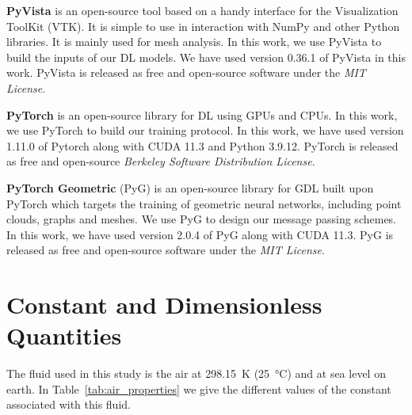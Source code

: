 \begin{subappendices}
	\textbf{PyVista} \cite{pyvista} is an open-source tool based on a handy interface for the Visualization ToolKit (VTK). It is simple to use in interaction with NumPy \cite{numpy} and other Python libraries. It is mainly used for mesh analysis. In this work, we use PyVista to build the inputs of our \acrshort{DL} models. We have used version 0.36.1 of PyVista in this work. PyVista is released as free and open-source software under the \emph{MIT License}.
	
	\textbf{PyTorch} \cite{NEURIPS2019_9015} is an open-source library for \acrshort{DL} using GPUs and CPUs. In this work, we use PyTorch to build our training protocol. In this work, we have used version 1.11.0 of Pytorch along with CUDA 11.3 and Python 3.9.12. PyTorch is released as free and open-source \emph{Berkeley Software Distribution License}.
	
	\textbf{PyTorch Geometric} (PyG) \cite{fey2019graph} is an open-source library for \acrshort{GDL} built upon PyTorch which targets the training  of geometric neural networks, including point clouds, graphs and meshes. We use PyG to design our message passing schemes. In this work, we have used version 2.0.4 of PyG along with CUDA 11.3. PyG is released as free and open-source software under the \emph{MIT License}.
	
	\section{Constant and Dimensionless Quantities}\label{ap:dimensionless}
	The fluid used in this study is the air at \SI{298.15}{\kelvin} (\SI{25}{\celsius}) and at sea level on earth. In Table~\ref{tab:air_properties} we give the different values of the constant associated with this fluid.
	

\end{subappendices}
